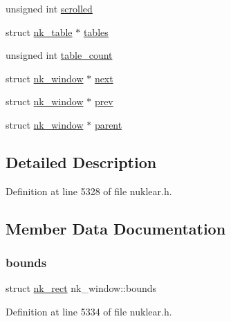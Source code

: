 \begin{DoxyCompactItemize}
\item 
unsigned int \mbox{\hyperlink{structnk__window_ae08590387048eac30fbfde13579ca39a}{scrolled}}
\item 
struct \mbox{\hyperlink{structnk__table}{nk\+\_\+table}} $\ast$ \mbox{\hyperlink{structnk__window_a5e7118c3d6354cce7d0a6b6ab19f2267}{tables}}
\item 
unsigned int \mbox{\hyperlink{structnk__window_a1a2c2bcd90b8f65838f0c4d38f9e3f6d}{table\+\_\+count}}
\item 
struct \mbox{\hyperlink{structnk__window}{nk\+\_\+window}} $\ast$ \mbox{\hyperlink{structnk__window_a43d9992fd6f4b1e86a325e099b7e49fa}{next}}
\item 
struct \mbox{\hyperlink{structnk__window}{nk\+\_\+window}} $\ast$ \mbox{\hyperlink{structnk__window_a467a7e9298d91e5226774ff6061a73b5}{prev}}
\item 
struct \mbox{\hyperlink{structnk__window}{nk\+\_\+window}} $\ast$ \mbox{\hyperlink{structnk__window_ade4eb319bf6471423d5d123a637f37c1}{parent}}
\end{DoxyCompactItemize}


\subsection{Detailed Description}


Definition at line 5328 of file nuklear.\+h.



\subsection{Member Data Documentation}
\mbox{\label{structnk__window_a3faf3afe7ee63b8203eae8cf28bf1272}} 
\subsubsection{\texorpdfstring{bounds}{bounds}}
{\footnotesize\ttfamily struct \mbox{\hyperlink{structnk__rect}{nk\+\_\+rect}} nk\+\_\+window\+::bounds}



Definition at line 5334 of file nuklear.\+h.

\mbox{\label{structnk__window_ab1a260769cace3a808d1361feeeaa002}} 
